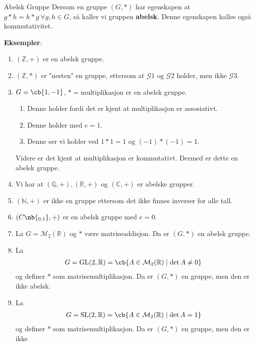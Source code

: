 \begin{definition}{Abelsk Gruppe}{}
	Dersom en gruppe $(G, *)$ har egenskapen at $g*h = h*g\ \forall g,h \in G$, så
	kaller vi gruppen \textbf{abelsk}. Denne egenskapen kalles også kommutativitet.
\end{definition}

\textbf{Eksempler}:
\begin{enumerate}
	\item $(\mathbb{Z}, +)$ er en abelsk gruppe.
	\item $(\mathbb{Z}, *)$ er "nesten" en gruppe, ettersom at $\mathscr{G}1$ og
	      $\mathscr{G}2$ holder, men ikke $\mathscr{G}3$.
	\item $G = \cb{1, -1}$, $* = \text{multiplikasjon}$ er en abelsk gruppe.
	      \begin{enumerate}[label=$\mathscr{G}$\arabic*)]
		      \item Denne holder fordi det er kjent at multiplikasjon er assosiativt.
		      \item Denne holder med $e = 1$.
		      \item Denne ser vi holder ved $1 * 1 = 1$ og $(-1) * (-1) = 1$.
	      \end{enumerate}
	      Videre er det kjent at multiplikasjon er kommutativt. Dermed er dette en abelsk
	      gruppe.
	\item Vi har at $(\mathbb{Q}, +), (\mathbb{R}, +)$ og $(\mathbb{C}, +)$ er abelske
	      grupper.
	\item $(\mathbb{N}, +)$ er ikke en gruppe ettersom det ikke finnes inverser for
	      alle tall.
	\item $(C\nb{\sb{0, 1}}, +)$ er en abelsk gruppe med $e = 0$.
	\item La $G = \mathcal{M}_2(\mathbb{R})$ og $*$ være matriseaddisjon. Da er
	      $(G, *)$ en abelsk gruppe.
	\item La
	      \begin{align}
		      G = \text{GL}(2,\mathbb{R}) =
		      \cb{A \in \mathcal{M}_2(\mathbb{R})\mid \det A \neq 0}
	      \end{align}
	      og definer $*$ som matrisemultiplikasjon. Da er $(G, *)$ en gruppe, men den er ikke
	      abelsk.
	\item La
	      \begin{align}
		      G = \text{SL}(2,\mathbb{R}) =
		      \cb{A \in \mathcal{M}_2(\mathbb{R})\mid \det A = 1}
	      \end{align}
	      og definer $*$ som matrisemultiplikasjon. Da er $(G, *)$ en gruppe, men den er ikke

\end{enumerate}
